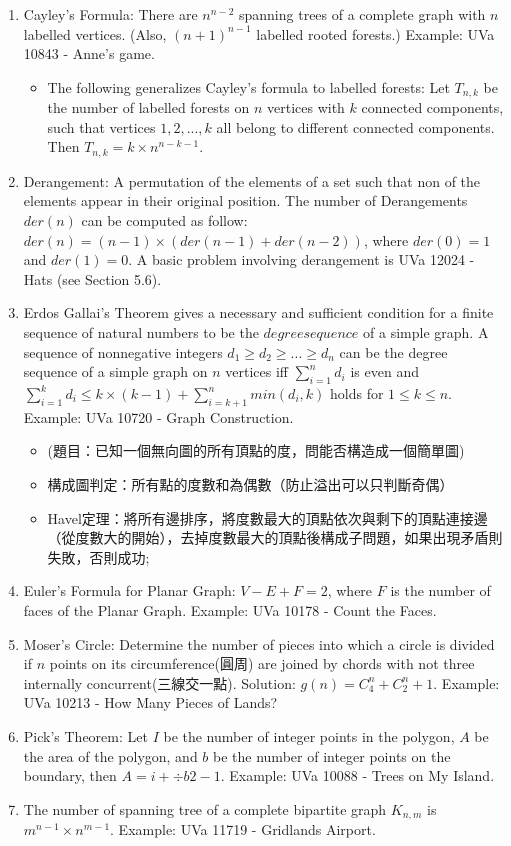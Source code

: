 
\begin{enumerate}
\item Cayley's Formula: There are $n^{n-2}$ spanning trees of a complete graph with $n$ labelled vertices. (Also, $(n+1)^{n-1}$ labelled rooted forests.) Example: UVa 10843 - Anne's game.
	\begin{itemize}
		\item The following generalizes Cayley's formula to labelled forests: Let $T_{n,k}$ be the number of labelled forests on $n$ vertices with $k$ connected components, such that vertices $1, 2, ..., k$ all belong to different connected components. Then $T_{n,k} = k\times n^{n − k − 1}$.
	\end{itemize}
\item Derangement: A permutation of the elements of a set such that non of the elements appear in their original position. The number of Derangements $der(n)$ can be computed as follow: $der(n) = (n-1) \times (der(n-1) + der(n-2))$, where $der(0) = 1$ and $der(1) = 0$. A basic problem involving derangement is UVa 12024 - Hats (see Section 5.6).
\item  Erdos Gallai's Theorem gives a necessary and sufficient condition for a finite sequence of natural numbers to be the $degree sequence$ of a simple graph. A sequence of nonnegative integers $d_1 \geq d_2 \geq ... \geq d_n$ can be the degree sequence of a simple graph on $n$ vertices iff $\sum_{i=1}^{n} d_i$ is even and $\sum_{i=1}^{k} d_i \leq k \times (k-1) + \sum_{i=k+1}^{n}min(d_i, k)$ holds for $1 \leq k \leq n$. Example: UVa 10720 - Graph Construction.
	\begin{itemize}
	\item (題目：已知一個無向圖的所有頂點的度，問能否構造成一個簡單圖)
	\item 構成圖判定：所有點的度數和為偶數（防止溢出可以只判斷奇偶）
	\item Havel定理：將所有邊排序，將度數最大的頂點依次與剩下的頂點連接邊（從度數大的開始），去掉度數最大的頂點後構成子問題，如果出現矛盾則失敗，否則成功;
	\end{itemize}
\item Euler's Formula for Planar Graph: $V-E+F=2$, where $F$ is the number of faces of the Planar Graph. Example: UVa 10178 - Count the Faces.
\item Moser's Circle: Determine the number of pieces into which a circle is divided if $n$ points on its circumference(圓周) are joined by chords with not three internally concurrent(三線交一點). Solution: $g(n) = C_{4}^{n} + C_{2}^{n} + 1$. Example: UVa 10213 - How Many Pieces of Lands?
\item Pick's Theorem: Let $I$ be the number of integer points in the polygon, $A$ be the area of the polygon, and $b$ be the number of integer points on the boundary, then $A = i + \div{b}{2} - 1$. Example: UVa 10088 - Trees on My Island.
\item The number of spanning tree of a complete bipartite graph $K_{n,m}$ is $m^{n-1} \times n^{m-1}$. Example: UVa 11719 - Gridlands Airport.
	
\end{enumerate}